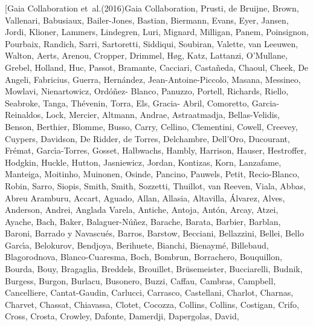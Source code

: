 \documentclass[twocolumn]{aastex62}
\begin{document}
\begin{thebibliography}{}
\bibitem[{{Gaia Collaboration} {et~al.}(2016){Gaia Collaboration}, {Prusti},
  {de Bruijne}, {Brown}, {Vallenari}, {Babusiaux}, {Bailer-Jones}, {Bastian},
  {Biermann}, {Evans}, {Eyer}, {Jansen}, {Jordi}, {Klioner}, {Lammers},
  {Lindegren}, {Luri}, {Mignard}, {Milligan}, {Panem}, {Poinsignon},
  {Pourbaix}, {Randich}, {Sarri}, {Sartoretti}, {Siddiqui}, {Soubiran},
  {Valette}, {van Leeuwen}, {Walton}, {Aerts}, {Arenou}, {Cropper}, {Drimmel},
  {H{\o}g}, {Katz}, {Lattanzi}, {O'Mullane}, {Grebel}, {Holland}, {Huc},
  {Passot}, {Bramante}, {Cacciari}, {Casta{\~n}eda}, {Chaoul}, {Cheek}, {De
  Angeli}, {Fabricius}, {Guerra}, {Hern{\'a}ndez}, {Jean-Antoine-Piccolo},
  {Masana}, {Messineo}, {Mowlavi}, {Nienartowicz}, {Ord{\'o}{\~n}ez- Blanco},
  {Panuzzo}, {Portell}, {Richards}, {Riello}, {Seabroke}, {Tanga},
  {Th{\'e}venin}, {Torra}, {Els}, {Gracia- Abril}, {Comoretto},
  {Garcia-Reinaldos}, {Lock}, {Mercier}, {Altmann}, {Andrae}, {Astraatmadja},
  {Bellas-Velidis}, {Benson}, {Berthier}, {Blomme}, {Busso}, {Carry},
  {Cellino}, {Clementini}, {Cowell}, {Creevey}, {Cuypers}, {Davidson}, {De
  Ridder}, {de Torres}, {Delchambre}, {Dell'Oro}, {Ducourant}, {Fr{\'e}mat},
  {Garc{\'\i}a-Torres}, {Gosset}, {Halbwachs}, {Hambly}, {Harrison}, {Hauser},
  {Hestroffer}, {Hodgkin}, {Huckle}, {Hutton}, {Jasniewicz}, {Jordan},
  {Kontizas}, {Korn}, {Lanzafame}, {Manteiga}, {Moitinho}, {Muinonen},
  {Osinde}, {Pancino}, {Pauwels}, {Petit}, {Recio-Blanco}, {Robin}, {Sarro},
  {Siopis}, {Smith}, {Smith}, {Sozzetti}, {Thuillot}, {van Reeven}, {Viala},
  {Abbas}, {Abreu Aramburu}, {Accart}, {Aguado}, {Allan}, {Allasia},
  {Altavilla}, {{\'A}lvarez}, {Alves}, {Anderson}, {Andrei}, {Anglada Varela},
  {Antiche}, {Antoja}, {Ant{\'o}n}, {Arcay}, {Atzei}, {Ayache}, {Bach},
  {Baker}, {Balaguer-N{\'u}{\~n}ez}, {Barache}, {Barata}, {Barbier}, {Barblan},
  {Baroni}, {Barrado y Navascu{\'e}s}, {Barros}, {Barstow}, {Becciani},
  {Bellazzini}, {Bellei}, {Bello Garc{\'\i}a}, {Belokurov}, {Bendjoya},
  {Berihuete}, {Bianchi}, {Bienaym{\'e}}, {Billebaud}, {Blagorodnova},
  {Blanco-Cuaresma}, {Boch}, {Bombrun}, {Borrachero}, {Bouquillon}, {Bourda},
  {Bouy}, {Bragaglia}, {Breddels}, {Brouillet}, {Br{\"u}semeister},
  {Bucciarelli}, {Budnik}, {Burgess}, {Burgon}, {Burlacu}, {Busonero}, {Buzzi},
  {Caffau}, {Cambras}, {Campbell}, {Cancelliere}, {Cantat-Gaudin}, {Carlucci},
  {Carrasco}, {Castellani}, {Charlot}, {Charnas}, {Charvet}, {Chassat},
  {Chiavassa}, {Clotet}, {Cocozza}, {Collins}, {Collins}, {Costigan}, {Crifo},
  {Cross}, {Crosta}, {Crowley}, {Dafonte}, {Damerdji}, {Dapergolas}, {David},
}
\end{thebibliography}
\end{document}

